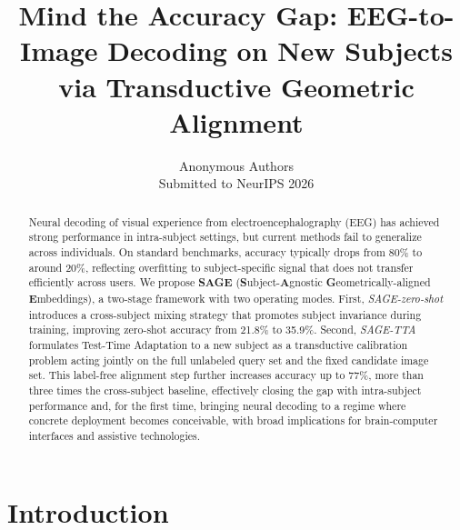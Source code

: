 \documentclass{article}
\title{Mind the Accuracy Gap: EEG-to-Image Decoding on New Subjects via Transductive Geometric Alignment}
\author{%
  Anonymous Authors\\
  Submitted to NeurIPS 2026\\
}
\begin{document}
\maketitle

\begin{abstract}

Neural decoding of visual experience from electroencephalography (EEG) has achieved strong performance in intra-subject settings, but current methods fail to generalize across individuals. On standard benchmarks, accuracy typically drops from 80\% to around 20\%, reflecting overfitting to subject-specific signal that does not transfer efficiently across users. We propose \textbf{SAGE} (\textbf{S}ubject-\textbf{A}gnostic \textbf{G}eometrically-aligned \textbf{E}mbeddings), a two-stage framework with two operating modes. First, \emph{SAGE-zero-shot} introduces a cross-subject mixing strategy that promotes subject invariance during training, improving zero-shot accuracy from 21.8\% to 35.9\%. Second, \emph{SAGE-TTA} formulates Test-Time Adaptation to a new subject as a transductive calibration problem acting jointly on the full unlabeled query set and the fixed candidate image set. This label-free alignment step further increases accuracy up to 77\%, more than three times the cross-subject baseline, effectively closing the gap with intra-subject performance and, for the first time, bringing neural decoding to a regime where concrete deployment becomes conceivable, with broad implications for brain-computer interfaces and assistive technologies.
\end{abstract}

\section{Introduction}
\label{sec:intro}
\end{document}
